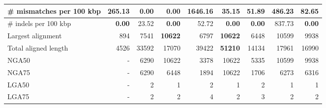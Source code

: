 \documentclass[12pt,a4paper]{article}
\begin{document}
\begin{table}[ht]
\begin{center}
\begin{tabular}{|l*{8}{|r}|}
\# mismatches per 100 kbp & 265.13 & {\bf 0.00} & {\bf 0.00} & 1646.16 & 35.15 & 51.89 & 486.23 & 82.65 \\ \hline
\# indels per 100 kbp & {\bf 0.00} & 23.52 & {\bf 0.00} & 52.72 & {\bf 0.00} & {\bf 0.00} & 837.73 & {\bf 0.00} \\ \hline
Largest alignment & 894 & 7541 & {\bf 10622} & 6797 & {\bf 10622} & 6448 & 10599 & 9938 \\ \hline
Total aligned length & 4526 & 33592 & 17070 & 39422 & {\bf 51210} & 14134 & 17961 & 16990 \\ \hline
NGA50 & - & 6290 & 10622 & 3378 & 10622 & 5335 & 10599 & 9938 \\ \hline
NGA75 & - & 6290 & 6448 & 1894 & 10622 & 1706 & 6273 & 6316 \\ \hline
LGA50 & - & 2 & 1 & 2 & 1 & 2 & 1 & 1 \\ \hline
LGA75 & - & 2 & 2 & 4 & 2 & 3 & 2 & 2 \\ \hline
\end{tabular}
\end{center}
\end{table}
\end{document}
